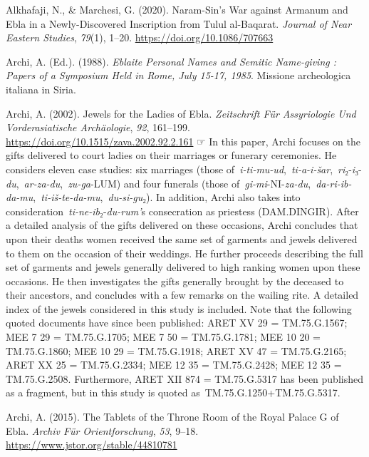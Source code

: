 \documentclass[
]{book}
\newlength{\cslhangindent}
\newlength{\cslentryspacingunit} %
\newenvironment{CSLReferences}[2] %
 {%
  \setlength{\parindent}{0pt}
  \ifodd #1
  \let\oldpar\par
  \def\par{\hangindent=\cslhangindent\oldpar}
  \fi
  \setlength{\parskip}{#2\cslentryspacingunit}
 }%
 {}
\newcommand{\CSLBlock}[1]{#1\hfill\break}
\begin{document}
\hypertarget{refs}{}
\begin{CSLReferences}{1}{0}
\leavevmode{}%
Alkhafaji, N., \& Marchesi, G. (2020). Naram-{Sin}'s {War} against {Armanum} and {Ebla} in a {Newly-Discovered Inscription} from {Tulul} al-{Baqarat}. \emph{Journal of Near Eastern Studies}, \emph{79}(1), 1--20. \url{https://doi.org/10.1086/707663}

\leavevmode{}%
Archi, A. (Ed.). (1988). \emph{Eblaite {Personal Names} and {Semitic Name-giving} : {Papers} of a {Symposium Held} in {Rome}, {July} 15-17, 1985}. Missione archeologica italiana in Siria.

\leavevmode{}%
Archi, A. (2002). Jewels for the {Ladies} of {Ebla}. \emph{Zeitschrift Für Assyriologie Und Vorderasiatische Archäologie}, \emph{92}, 161--199. \url{https://doi.org/10.1515/zava.2002.92.2.161}
\CSLBlock{\newline☞ In this paper, Archi focuses on the gifts delivered to court ladies on their marriages or funerary ceremonies. He considers eleven case studies: six marriages (those of~\emph{i-ti-mu-ud},~\emph{ti-a-i-šar},~\emph{ri}₂-\emph{i}₃-\emph{du},~\emph{ar-za-du},~\emph{zu-ga}-LUM) and four funerals (those of~\emph{gi-mi}-NI-\emph{za-du},~\emph{da-ri-ib-da-mu},~\emph{ti-iš-te-da-mu},~\emph{du-si-gu}₂). In addition, Archi also takes into consideration~\emph{ti-ne-ib}₂-\emph{du-rum'}s consecration as priestess (DAM.DINGIR). After a detailed analysis of the gifts delivered on these occasions, Archi concludes that upon their deaths women received the same set of garments and jewels delivered to them on the occasion of their weddings. He further proceeds describing the full set of garments and jewels generally delivered to high ranking women upon these occasions. He then investigates the gifts generally brought by the deceased to their ancestors, and concludes with a few remarks on the wailing rite. A detailed index of the jewels considered in this study is included. Note that the following quoted documents have since been published: ARET XV 29 = TM.75.G.1567; MEE 7 29 = TM.75.G.1705; MEE 7 50 = TM.75.G.1781; MEE 10 20 = TM.75.G.1860; MEE 10 29 = TM.75.G.1918; ARET XV 47 = TM.75.G.2165; ARET XX 25 = TM.75.G.2334; MEE 12 35 = TM.75.G.2428; MEE 12 35 = TM.75.G.2508. Furthermore, ARET XII 874 = TM.75.G.5317 has been published as a fragment, but in this study is quoted as~TM.75.G.1250+TM.75.G.5317.}

\leavevmode{}%
Archi, A. (2015). The {Tablets} of the {Throne Room} of the {Royal Palace G} of {Ebla}. \emph{Archiv Für Orientforschung}, \emph{53}, 9--18. \url{https://www.jstor.org/stable/44810781}


\end{CSLReferences}
\end{document}
